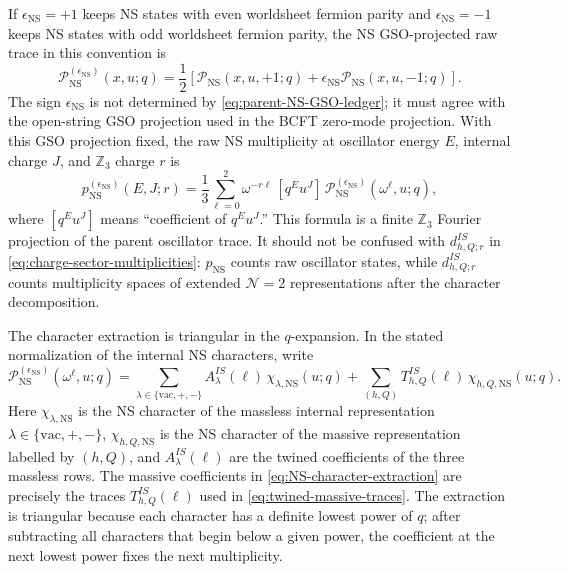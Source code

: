 \documentclass[11pt]{article}
\newcommand{\Z}{\mathbb{Z}}
\newcommand{\vac}{\mathrm{vac}}
\newcommand{\NS}{\mathrm{NS}}
\begin{document}
If \(\epsilon_{\NS}=+1\) keeps NS states with even worldsheet fermion parity and
\(\epsilon_{\NS}=-1\) keeps NS states with odd worldsheet fermion parity, the NS GSO-projected
raw trace in this convention is
\begin{equation}
  \mathcal P_{\NS}^{(\epsilon_{\NS})}(x,u;q)
  =
  \frac12\left[
    \mathcal P_{\NS}(x,u,+1;q)
    +
    \epsilon_{\NS}\mathcal P_{\NS}(x,u,-1;q)
  \right].
  \label{eq:parent-NS-GSO-ledger}
\end{equation}
The sign \(\epsilon_{\NS}\) is not determined by \eqref{eq:parent-NS-GSO-ledger}; it must agree
with the open-string GSO projection used in the BCFT zero-mode projection. With this GSO
projection fixed,
the raw NS multiplicity at
oscillator energy \(E\), internal charge \(J\), and \(\Z_3\) charge \(r\) is
\begin{equation}
  p_{\NS}^{(\epsilon_{\NS})}(E,J;r)
  =
  \frac13\sum_{\ell=0}^2
  \omega^{-r\ell}\,
  [q^E u^J]\,
  \mathcal P_{\NS}^{(\epsilon_{\NS})}(\omega^\ell,u;q),
  \label{eq:raw-NS-charge-sector-ledger}
\end{equation}
where \([q^E u^J]\) means ``coefficient of \(q^E u^J\).'' This formula is a finite
\(\Z_3\) Fourier projection of the parent oscillator trace. It should not be confused with
\(d_{h,Q;r}^{IS}\) in \eqref{eq:charge-sector-multiplicities}: \(p_{\NS}\) counts raw
oscillator states, while \(d_{h,Q;r}^{IS}\) counts multiplicity spaces of extended
\(\mathcal N=2\) representations after the character decomposition.

The character extraction is triangular in the \(q\)-expansion. In the stated normalization of
the internal NS characters, write
\begin{equation}
  \mathcal P_{\NS}^{(\epsilon_{\NS})}(\omega^\ell,u;q)
  =
  \sum_{\lambda\in\{\vac,+,-\}}
  A_{\lambda}^{IS}(\ell)\,\chi_{\lambda,\NS}(u;q)
  +
  \sum_{(h,Q)}
  T_{h,Q}^{IS}(\ell)\,\chi_{h,Q,\NS}(u;q).
  \label{eq:NS-character-extraction}
\end{equation}
Here \(\chi_{\lambda,\NS}\) is the NS character of the massless internal representation
\(\lambda\in\{\vac,+,-\}\), \(\chi_{h,Q,\NS}\) is the NS character of the massive
representation labelled by \((h,Q)\), and \(A_{\lambda}^{IS}(\ell)\) are the twined
coefficients of the three massless rows. The massive coefficients in
\eqref{eq:NS-character-extraction} are precisely the traces \(T_{h,Q}^{IS}(\ell)\) used in
\eqref{eq:twined-massive-traces}. The extraction is triangular because each character has a
definite lowest power of \(q\); after subtracting all characters that begin below a given
power, the coefficient at the next lowest power fixes the next multiplicity.
\end{document}
